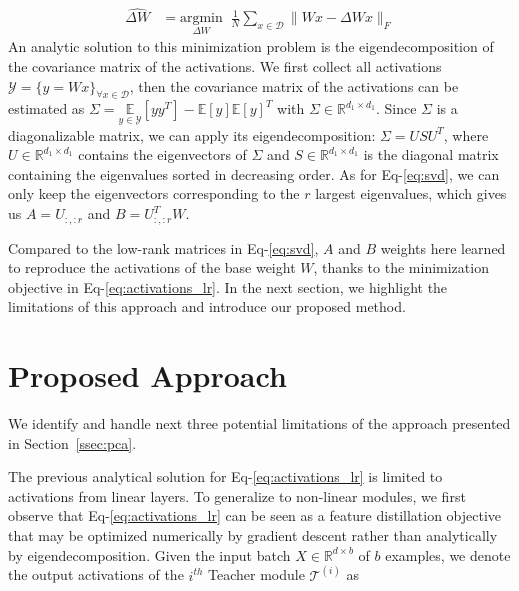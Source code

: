 \documentclass[11pt]{article}
\begin{document}
\begingroup
\setlength{\abovedisplayskip}{0pt}
\setlength{\belowdisplayskip}{3pt}
{\small{
\begin{align}
    \label{eq:activations_lr}
    \widehat{\Delta W} &= \underset{{\Delta W}}{\mathrm{argmin}} \;\; \frac{1}{N}\sum\limits_{x \in \mathcal{D}}\|Wx - {\Delta Wx}\|_{F}
\end{align}
}}
\endgroup
An analytic solution to this minimization problem is the eigendecomposition of the covariance matrix of the activations. We first collect all activations $\mathcal{Y}=\{y=Wx\}_{\forall x\in \mathcal{D}}$, then
the covariance matrix of the activations can be estimated as {\small{$\Sigma = \underset{y \in \mathcal{Y}}{\mathbb{E}}\left[yy^T\right] - \mathbb{E}[y]\mathbb{E}[y]^T$}}
with $\Sigma \in \mathbb{R}^{d_{1} \times d_{1}}$. Since $\Sigma$ is a diagonalizable matrix, we can apply its eigendecomposition: $\Sigma = USU^{T}$, where $U \in \mathbb{R}^{d_{1} \times d_1}$ contains the eigenvectors of $\Sigma$ and $S \in \mathbb{R}^{d_{1} \times d_{1}}$ is the diagonal matrix containing the eigenvalues sorted in decreasing order. As for Eq-\ref{eq:svd}, we can only keep the eigenvectors corresponding to the $r$ largest eigenvalues, which gives us $A = U_{:, :r}$ and $B =  U_{:, :r}^{T}W$.

Compared to the low-rank matrices in Eq-\ref{eq:svd}, $A$ and $B$ weights here learned to reproduce the activations of the base weight $W$, thanks to the minimization objective in Eq-\ref{eq:activations_lr}. In the next section, we highlight the limitations of this approach and introduce our proposed method.

\section{Proposed Approach}
\label{sec:method}
We identify and handle next three potential limitations of the approach presented in Section~\ref{ssec:pca}.

The previous analytical solution for Eq-\ref{eq:activations_lr} is limited to activations from linear layers.
To generalize to non-linear modules, we first observe that Eq-\ref{eq:activations_lr} can be seen as a feature distillation objective that may be optimized numerically by gradient descent rather than analytically by eigendecomposition. Given the input batch {\small{$X \in \mathbb{R}^{d \times b}$}} of $b$ examples, we denote the output activations of the {\small{$i^{th}$}} Teacher module {\small{$\mathcal{T}^{(i)}$}} as 
\end{document}
